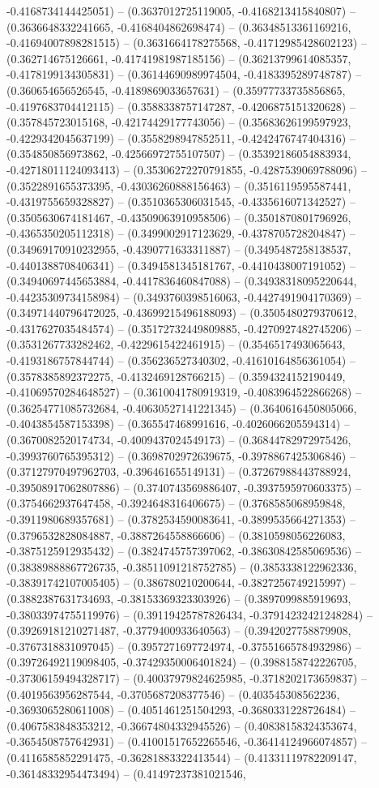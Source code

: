 -0.4168734144425051) -- (0.3637012725119005, -0.4168213415840807) -- (0.3636648332241665, -0.4168404862698474) -- (0.36348513361169216, -0.41694007898281515) -- (0.3631664178275568, -0.41712985428602123) -- (0.362714675126661, -0.41741981987185156) -- (0.36213799614085357, -0.4178199134305831) -- (0.36144690989974504, -0.4183395289748787) -- (0.360654656526545, -0.4189869033657631) -- (0.35977733735856865, -0.4197683704412115) -- (0.3588338757147287, -0.4206875151320628) -- (0.357845723015168, -0.42174429177743056) -- (0.35683626199597923, -0.4229342045637199) -- (0.3558298947852511, -0.4242476747404316) -- (0.354850856973862, -0.42566972755107507) -- (0.35392186054883934, -0.42718011124093413) -- (0.35306272270791855, -0.4287539069788096) -- (0.3522891655373395, -0.43036260888156463) -- (0.3516119595587441, -0.4319755659328827) -- (0.3510365306031545, -0.4335616071342527) -- (0.3505630674181467, -0.43509063910958506) -- (0.3501870801796926, -0.4365350205112318) -- (0.3499002917123629, -0.4378705728204847) -- (0.34969170910232955, -0.4390771633311887) -- (0.3495487258138537, -0.4401388708406341) -- (0.3494581345181767, -0.4410438007191052) -- (0.34940697445653884, -0.4417836460847088) -- (0.34938318095220644, -0.44235309734158984) -- (0.3493760398516063, -0.4427491904170369) -- (0.34971440796472025, -0.43699215496188093) -- (0.3505480279370612, -0.4317627035484574) -- (0.35172732449809885, -0.4270927482745206) -- (0.3531267733282462, -0.4229615422461915) -- (0.3546517493065643, -0.4193186757844744) -- (0.356236527340302, -0.41610164856361054) -- (0.3578385892372275, -0.4132469128766215) -- (0.3594324152190449, -0.41069570284648527) -- (0.3610041780919319, -0.4083964522866268) -- (0.36254771085732684, -0.40630527141221345) -- (0.3640616450805066, -0.4043854587153398) -- (0.365547468991616, -0.4026066205594314) -- (0.3670082520174734, -0.4009437024549173) -- (0.36844782972975426, -0.3993760765395312) -- (0.3698702972639675, -0.3978867425306846) -- (0.37127970497962703, -0.396461655149131) -- (0.37267988443788924, -0.39508917062807886) -- (0.3740743569886407, -0.3937595970603375) -- (0.3754662937647458, -0.3924648316406675) -- (0.3768585068959848, -0.3911980689357681) -- (0.3782534590083641, -0.3899535664271353) -- (0.3796532828084887, -0.3887264558866606) -- (0.3810598056226083, -0.3875125912935432) -- (0.3824745757397062, -0.38630842585069536) -- (0.38389888867726735, -0.38511091218752785) -- (0.3853338122962336, -0.38391742107005405) -- (0.386780210200644, -0.3827256749215997) -- (0.3882387631734693, -0.38153369323303926) -- (0.3897099885919693, -0.38033974755119976) -- (0.39119425787826434, -0.37914232421248284) -- (0.39269181210271487, -0.3779400933640563) -- (0.3942027758879908, -0.3767318831097045) -- (0.3957271697724974, -0.37551665784932986) -- (0.39726492119098405, -0.37429350006401824) -- (0.3988158742226705, -0.37306159494328717) -- (0.40037979824625985, -0.3718202173659837) -- (0.4019563956287544, -0.3705687208377546) -- (0.403545308562236, -0.3693065280611008) -- (0.4051461251504293, -0.3680331228726484) -- (0.4067583848353212, -0.36674804332945526) -- (0.40838158324353674, -0.3654508757642931) -- (0.41001517652265546, -0.36414124966074857) -- (0.4116585852291475, -0.36281883322413544) -- (0.41331119782209147, -0.36148332954473494) -- (0.41497237381021546, 
